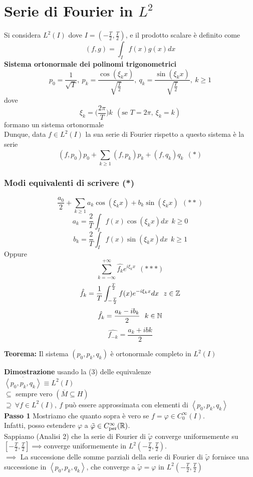 
\section{Serie di Fourier in $L^2$}
Si considera $L^{2}(I)$ dove $I=(-\frac{T}{2},\frac{T}{2})$, e il prodotto scalare è definito come
\[(f,g)=\int_{I}^{} f(x)g(x)dx\]
\textbf{Sistema ortonormale dei polinomi trigonometrici}
\[p_0=\frac{1}{\sqrt{T} },\ p_k=\frac{\cos(\xi_kx)}{\sqrt{\frac{T}{2}} },\ q_k= \frac{\sin(\xi_kx)}{\sqrt{\frac{T}{2}} },\ k\ge 1\]
dove 
\[\xi_k=\bigg(\frac{2\pi}{T}\bigg)k\ \ (\text{se }T=2\pi,\ \xi_k=k)\]
formano un sistema ortonormale
\\Dunque, data $f\in L^{2}(I)$ la sua serie di Fourier rispetto a questo sistema è la serie
\[(f,p_0)p_0+\sum_{k\ge 1}^{} (f,p_k)p_k+(f,q_k)q_k\ \ (*)\]
\subsubsection{Modi equivalenti di scrivere (*)}
\[\frac{a_0}{2}+\sum_{k\ge 1}^{} a_k\cos(\xi_kx)+b_k\sin(\xi_kx)\ \ (* *)\]
\[a_k=\frac{2}{T}\int_{I}^{} f(x)\cos(\xi_kx)dx\ \ k\ge 0\]
\[b_k=\frac{2}{T}\int_{I}^{} f(x)\sin(\xi_kx)dx\ \ k\ge 1\]
Oppure 
\[\sum_{k=-\infty}^{+\infty} \hat{f_k}e^{i\xi_kx}\ \ (* * *)\]
\[\hat{f_k}=\frac{1}{T}\int_{-\frac{T}{2}}^{\frac{T}{2}} f(x)e^{-i\xi_kx}dx\ \ z\in \mathbb{Z}\]
\[\hat{f_k}= \frac{a_k-ib_k}{2}\ \ k\in \mathbb{N}\]
\[\hat{f_{-k}}=\frac{a_k+ibk}{2} \]
\begin{tcolorbox}
	\textbf{Teorema: }Il sistema $(p_0,p_k,q_k)$ è ortonormale completo in $L^{2}(I)$
\end{tcolorbox}
\textbf{Dimostrazione} usando la (3) delle equivalenze
\\$\overline{\left< p_0,p_k,q_k \right> }\equiv L^{2}(I)$ 
\\$\subseteq  $ sempre vero $(\overline{M}\subseteq  H)$ 
\\$\supseteq \ \forall f\in L^{2}(I),\ f$ può essere approssimata con elementi di $\left< p_0,p_k,q_k \right> $
\\\textbf{Passo 1} Mostriamo che quanto sopra è vero se $f=\varphi\in C_0^\infty(I)$.
\\Infatti, posso estendere $\varphi$ a $\tilde\varphi\in C_{\text{per}}^\infty(\mathbb{R})$.
\\Sappiamo (Analisi 2) che la serie di Fourier di $\tilde\varphi$ converge uniformemente su $[-\frac{T}{2},\frac{T}{2}]\implies $converge uniformemente in $L^{2}(-\frac{T}{2},\frac{T}{2})$.
\\$\implies $ La successione delle somme parziali della serie di Fourier di $\tilde\varphi$ fornisce una successione in $\left< p_0,p_k,q_k \right> $, che converge a $\tilde\varphi=\varphi$ in $L^{2}(-\frac{T}{2},\frac{T}{2})$
